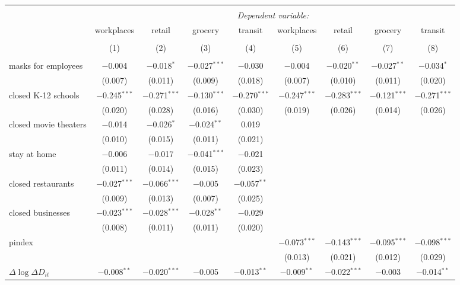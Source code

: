 \begin{tabular}{@{\extracolsep{1pt}}lcccccccc} 
\\[-1.8ex]\hline 
\hline \\[-1.8ex] 
 & \multicolumn{8}{c}{\textit{Dependent variable:}} \\ 
\cline{2-9} 
 & workplaces & retail & grocery & transit & workplaces & retail & grocery & transit \\ 
\\[-1.8ex] & (1) & (2) & (3) & (4) & (5) & (6) & (7) & (8)\\ 
\hline \\[-1.8ex] 
 masks for employees & $-$0.004 & $-$0.018$^{*}$ & $-$0.027$^{***}$ & $-$0.030 & $-$0.004 & $-$0.020$^{**}$ & $-$0.027$^{**}$ & $-$0.034$^{*}$ \\ 
  & (0.007) & (0.011) & (0.009) & (0.018) & (0.007) & (0.010) & (0.011) & (0.020) \\ 
  closed K-12 schools & $-$0.245$^{***}$ & $-$0.271$^{***}$ & $-$0.130$^{***}$ & $-$0.270$^{***}$ & $-$0.247$^{***}$ & $-$0.283$^{***}$ & $-$0.121$^{***}$ & $-$0.271$^{***}$ \\ 
  & (0.020) & (0.028) & (0.016) & (0.030) & (0.019) & (0.026) & (0.014) & (0.026) \\ 
  closed movie theaters & $-$0.014 & $-$0.026$^{*}$ & $-$0.024$^{**}$ & 0.019 &  &  &  &  \\ 
  & (0.010) & (0.015) & (0.011) & (0.021) &  &  &  &  \\ 
  stay at home & $-$0.006 & $-$0.017 & $-$0.041$^{***}$ & $-$0.021 &  &  &  &  \\ 
  & (0.011) & (0.014) & (0.015) & (0.023) &  &  &  &  \\ 
  closed restaurants & $-$0.027$^{***}$ & $-$0.066$^{***}$ & $-$0.005 & $-$0.057$^{**}$ &  &  &  &  \\ 
  & (0.009) & (0.013) & (0.007) & (0.025) &  &  &  &  \\ 
  closed businesses & $-$0.023$^{***}$ & $-$0.028$^{***}$ & $-$0.028$^{**}$ & $-$0.029 &  &  &  &  \\ 
  & (0.008) & (0.011) & (0.011) & (0.020) &  &  &  &  \\ 
  pindex &  &  &  &  & $-$0.073$^{***}$ & $-$0.143$^{***}$ & $-$0.095$^{***}$ & $-$0.098$^{***}$ \\ 
  &  &  &  &  & (0.013) & (0.021) & (0.012) & (0.029) \\ 
  $\Delta \log \Delta D_{it}$ & $-$0.008$^{**}$ & $-$0.020$^{***}$ & $-$0.005 & $-$0.013$^{**}$ & $-$0.009$^{**}$ & $-$0.022$^{***}$ & $-$0.003 & $-$0.014$^{**}$ \\ 

\end{tabular}
